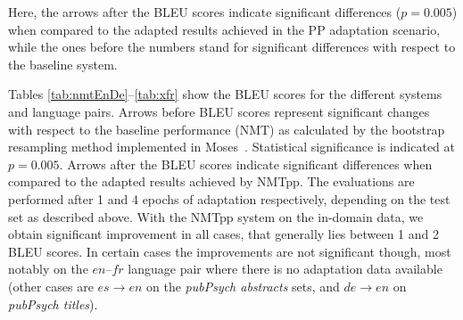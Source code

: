 \documentclass[a4paper,11pt]{article}
\newcommand{\mc}[3]{\multicolumn{#1}{#2}{#3}}
\begin{document}
\begin{table}
	\caption{BLEU scores for the different systems used to domain-adapt the general NMT system for the phsycological domain German--English. Arrows mark statistical significance (see text) and best results on each test set are shown in bold (in case of significant improvements).}
	\label{tab:nmtEnDe}               
\end{table}


Here, the arrows after the BLEU scores indicate significant differences ($p=0.005$) when compared to the adapted results achieved in the PP adaptation scenario, while the ones before the numbers stand for significant differences with respect to the baseline system.

Tables \ref{tab:nmtEnDe}--\ref{tab:xfr} show the BLEU scores for the different systems and language pairs. Arrows before BLEU scores represent significant changes with respect to the baseline performance (NMT) as calculated by the bootstrap resampling method implemented in Moses~\cite{koehn04}. Statistical significance is indicated at $p=0.005$. Arrows after the BLEU scores indicate significant differences when compared to the adapted results achieved by NMTpp. The evaluations are performed after 1 and 4 epochs of adaptation respectively, depending on the test set as described above. With the NMTpp system on the in-domain data, we obtain significant improvement in all cases, that generally lies between 1 and 2 BLEU scores. In certain cases the improvements are not significant though, most notably on the $en$--$fr$ language pair where there is no adaptation data available (other cases are $es\rightarrow en$ on the \textit{pubPsych abstracts} sets, and $de\rightarrow en$ on \textit{pubPsych titles}). 
\end{document}
